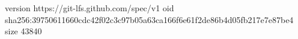 version https://git-lfs.github.com/spec/v1
oid sha256:39750611660cdc42f02c3c97b05a63ca166f6e61f2de86b4d05fb217e7e87be4
size 43840
